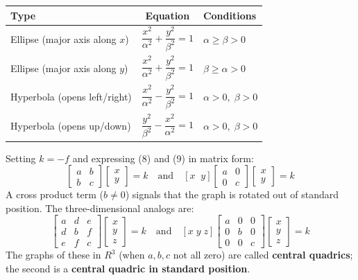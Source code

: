 \documentclass{article}
\begin{document}
\begin{center}
\renewcommand{\arraystretch}{1.6}
\begin{tabular}{|l|c|l|}
\hline
\textbf{Type} & \textbf{Equation} & \textbf{Conditions}\\
\hline
Ellipse (major axis along $x$) & $\dfrac{x^2}{\alpha^2}+\dfrac{y^2}{\beta^2}=1$ & $\alpha\ge\beta>0$\\
\hline
Ellipse (major axis along $y$) & $\dfrac{x^2}{\alpha^2}+\dfrac{y^2}{\beta^2}=1$ & $\beta\ge\alpha>0$\\
\hline
Hyperbola (opens left/right) & $\dfrac{x^2}{\alpha^2}-\dfrac{y^2}{\beta^2}=1$ & $\alpha>0,\;\beta>0$\\
\hline
Hyperbola (opens up/down) & $\dfrac{y^2}{\beta^2}-\dfrac{x^2}{\alpha^2}=1$ & $\alpha>0,\;\beta>0$\\
\hline
\end{tabular}
\end{center}
\vspace{2mm}

Setting $k=-f$ and expressing (8) and (9) in matrix form:
\begin{equation}
  [x\;\;y]\begin{bmatrix}a&b\\b&c\end{bmatrix}\begin{bmatrix}x\\y\end{bmatrix}=k
  \quad\text{and}\quad
  [x\;\;y]\begin{bmatrix}a&0\\0&c\end{bmatrix}\begin{bmatrix}x\\y\end{bmatrix}=k \tag{10}
\end{equation}
A cross product term ($b\neq0$) signals that the graph is rotated out of standard position.
The three-dimensional analogs are:
\begin{equation}
  [x\;y\;z]\begin{bmatrix}a&d&e\\d&b&f\\e&f&c\end{bmatrix}\begin{bmatrix}x\\y\\z\end{bmatrix}=k
  \quad\text{and}\quad
  [x\;y\;z]\begin{bmatrix}a&0&0\\0&b&0\\0&0&c\end{bmatrix}\begin{bmatrix}x\\y\\z\end{bmatrix}=k \tag{11}
\end{equation}
The graphs of these in $R^3$ (when $a,b,c$ not all zero) are called \textbf{central quadrics};
the second is a \textbf{central quadric in standard position}.
\end{document}
